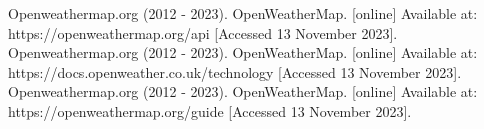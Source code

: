 \documentclass[../paper.tex]{subfiles}
\begin{document}
\begin{thebibliography}{00}
     Openweathermap.org (2012 - 2023).
    OpenWeatherMap.
    [online] Available at: https://openweathermap.org/api [Accessed 13 November 2023].
     Openweathermap.org (2012 - 2023).
    OpenWeatherMap.
    [online] Available at: https://docs.openweather.co.uk/technology [Accessed 13 November 2023].
     Openweathermap.org (2012 - 2023).
    OpenWeatherMap.
    [online] Available at: https://openweathermap.org/guide [Accessed 13 November 2023].
\end{thebibliography}
\end{document}
